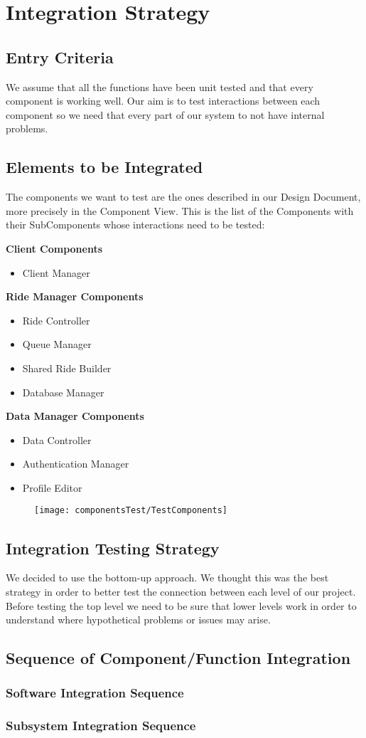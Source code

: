 \section{Integration Strategy}
\subsection{Entry Criteria}
We assume that all the functions have been unit tested and that every component is working well. Our aim is to test interactions between each component so we need that every part of our system to not have internal problems.
\subsection{Elements to be Integrated}
The components we want to test are the ones described in our Design Document, more precisely in the Component View.\newline
This is the list of the Components with their SubComponents whose interactions need to be tested: \newline
\newpage

\noindentation\textbf{Client Components}
\begin {itemize}
\item Client Manager
\end {itemize}
\textbf{Ride Manager Components}
\begin{itemize}
\item Ride Controller
\item Queue Manager
\item Shared Ride Builder
\item Database Manager
\end {itemize}
\textbf{Data Manager Components}
\begin {itemize}
\item Data Controller
\item Authentication Manager
\item Profile Editor
\end{itemize}

\begin{figure}[h!]
  \centering
  \texttt{[image: componentsTest/TestComponents]}
\end{figure}

\subsection{Integration Testing Strategy}
We decided to use the bottom-up approach. We thought this was the best strategy in order to better test the connection between each level of our project.
Before testing the top level we need to be sure that lower levels work in order to understand where hypothetical problems or issues may arise.

\subsection{Sequence of Component/Function Integration}
\subsubsection{Software Integration Sequence}
\subsubsection{Subsystem Integration Sequence}
